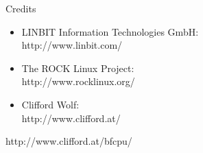 \documentclass[pdf]{prosper}
\begin{document}
\begin{slide}{Credits}
\begin{itemize}

\item LINBIT Information Technologies GmbH: \\
http://www.linbit.com/
\vspace*{.5cm}

\item The ROCK Linux Project: \\
http://www.rocklinux.org/
\vspace*{.5cm}

\item Clifford Wolf: \\
http://www.clifford.at/
\vspace*{.5cm}

\end{itemize}

\vspace*{1.5cm}\hspace*{2cm}
http://www.clifford.at/bfcpu/

\end{slide}
\end{document}

